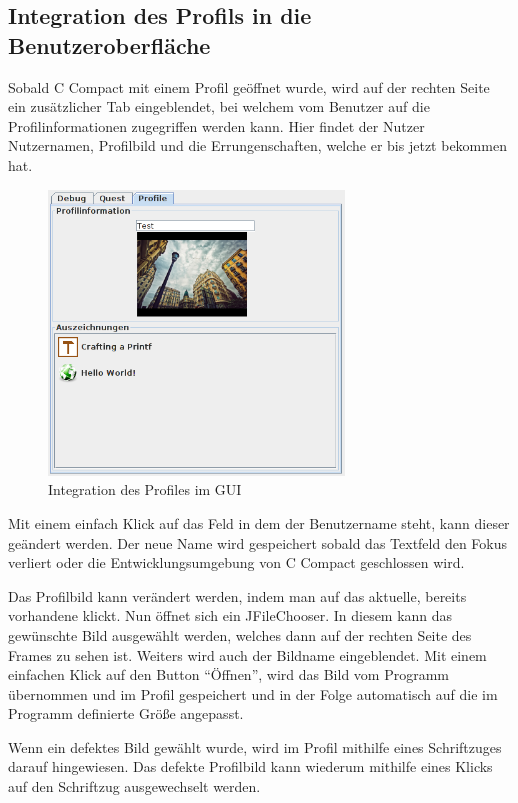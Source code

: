 \iffabian
\else
	\subsection{Integration des Profils in die Benutzeroberfläche}
\fi

Sobald C Compact mit einem Profil geöffnet wurde, wird auf der rechten Seite ein zusätzlicher Tab eingeblendet, bei welchem vom Benutzer auf die Profilinformationen zugegriffen werden kann. Hier findet der Nutzer Nutzernamen, Profilbild und die Errungenschaften, welche er bis jetzt bekommen hat.

\begin{figure}[h] 
  \centering
     \includegraphics[width=0.7\textwidth]{./media/images/gui/profile.png}
  \caption{Integration des Profiles im GUI}
  \label{fig:profile_gui}
\end{figure}


Mit einem einfach Klick auf das Feld in dem der Benutzername steht, kann dieser geändert werden. Der neue Name wird gespeichert sobald das Textfeld den Fokus verliert oder die Entwicklungsumgebung von C Compact geschlossen wird.

Das Profilbild kann verändert werden, indem man auf das aktuelle, bereits vorhandene klickt. Nun öffnet sich ein JFileChooser. In diesem kann das gewünschte Bild ausgewählt werden, welches dann auf der rechten Seite des Frames zu sehen ist. Weiters wird auch der Bildname eingeblendet. Mit einem einfachen Klick auf den Button "`Öffnen"', wird das Bild vom Programm übernommen und im Profil gespeichert und in der Folge automatisch auf die im Programm definierte Größe angepasst.

Wenn ein defektes Bild gewählt wurde, wird im Profil mithilfe eines Schriftzuges darauf hingewiesen. Das defekte Profilbild kann wiederum mithilfe eines Klicks auf den Schriftzug ausgewechselt werden.

